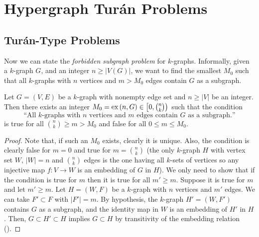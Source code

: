 \section{Hypergraph Turán Problems}\label{sec:extremal}

\subsection{Turán-Type Problems}\label{subsec:turan}

Now we can state the \emph{forbidden subgraph problem} for $k$-graphs.
Informally, given a $k$-graph $G$, and an integer $n \geq |V(G)|$,
we want to find the smallest $M_0$ such that all $k$-graphs with $n$ vertices and $m > M_0$ edges
contain $G$ as a subgraph.

\begin{proposition} \label{prop:extremal}
    Let $G = (V, E)$ be a $k$-graph with nonempty edge set and $n \geq |V|$ be an integer.
    Then there exists an integer $M_0 = \text{ex} \left( n, G \right) \in \left[ 0, \binom{n}{k}\right)$ such that
    the condition
    \[
        \text{``All $k$-graphs with $n$ vertices and $m$ edges contain $G$ as a subgraph.''}
    \]
    is true for all $\binom{n}{k} \geq m > M_0$ and false for all $0 \leq m \leq M_0$.

    \begin{proof}
        Note that, if such an $M_0$ exists, clearly it is unique.
        Also, the condition is clearly false for $m = 0$ and
        true for $m = \binom{n}{k}$
        (the only $k$-graph $H$ with vertex set $W$, $|W|=n$ and $\binom{n}{k}$ edges
        is the one having all $k$-sets of vertices so any injective map $f: V \to W$
        is an embedding of $G$ in $H$).
        We only need to show that if the condition is true for $m$ then it is true for
        all $m' \geq m$.
        Suppose it is true for $m$ and let $m' \geq m$.
        Let $H = (W, F)$ be a $k$-graph with $n$ vertices and $m'$ edges.
        We can take $F' \subset F$ with $|F'| = m$.
        By hypothesis, the $k$-graph $H' = (W, F')$ contains $G$ as a subgraph,
        and the identity map in $W$ is an embedding of $H'$ in $H$.
        Then, $G \subset H' \subset H$ implies $G \subset H$ by transitivity of the embedding
        relation ().

    \end{proof}

\end{proposition}

